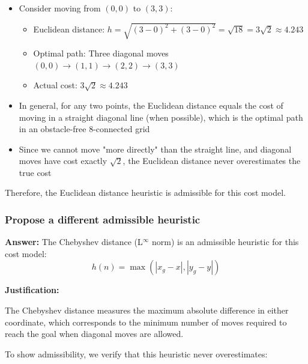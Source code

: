 \documentclass[11pt]{article}
\begin{document}
\begin{itemize}
    \item Consider moving from $(0,0)$ to $(3,3)$:
    \begin{itemize}
        \item Euclidean distance: $h = \sqrt{(3-0)^2 + (3-0)^2} = \sqrt{18} = 3\sqrt{2} \approx 4.243$
        \item Optimal path: Three diagonal moves $(0,0) \rightarrow (1,1) \rightarrow (2,2) \rightarrow (3,3)$
        \item Actual cost: $3\sqrt{2} \approx 4.243$
    \end{itemize}
    \item In general, for any two points, the Euclidean distance equals the cost of moving in a straight diagonal line (when possible), which is the optimal path in an obstacle-free 8-connected grid
    \item Since we cannot move "more directly" than the straight line, and diagonal moves have cost exactly $\sqrt{2}$, the Euclidean distance never overestimates the true cost
\end{itemize}

Therefore, the Euclidean distance heuristic is admissible for this cost model.

\subsubsection{Propose a different admissible heuristic}

\textbf{Answer:} The Chebyshev distance (L$^\infty$ norm) is an admissible heuristic for this cost model:
$$h(n) = \max(|x_g - x|, |y_g - y|)$$

\textbf{Justification:}

The Chebyshev distance measures the maximum absolute difference in either coordinate, which corresponds to the minimum number of moves required to reach the goal when diagonal moves are allowed.

To show admissibility, we verify that this heuristic never overestimates:
\end{document}
